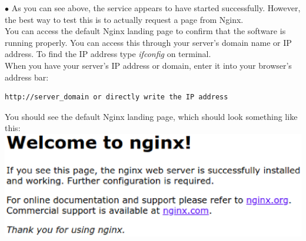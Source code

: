 \documentclass[journal,12pt,onecolumn]{IEEEtran}
\begin{document}
\begin{flushleft}
$\bullet$ As you can see above, the service appears to have started successfully. However, the best way to test this is to actually request a page from Nginx.\\
\medskip
You can access the default Nginx landing page to confirm that the software is running properly. You can access this through your server's domain name or IP address. To find the IP address type \textit{ifconfig} on terminal.\\
\medskip
When you have your server's IP address or domain, enter it into your browser's address bar:\\
\medskip
\begin{lstlisting}[frame=single,linewidth=15cm,breaklines=true]
http://server_domain or directly write the IP address
\end{lstlisting}
\bigskip
You should see the default Nginx landing page, which should look something like this:\\
\medskip
\includegraphics[scale=.5]{img2.eps}


\end{flushleft}
\end{document}
